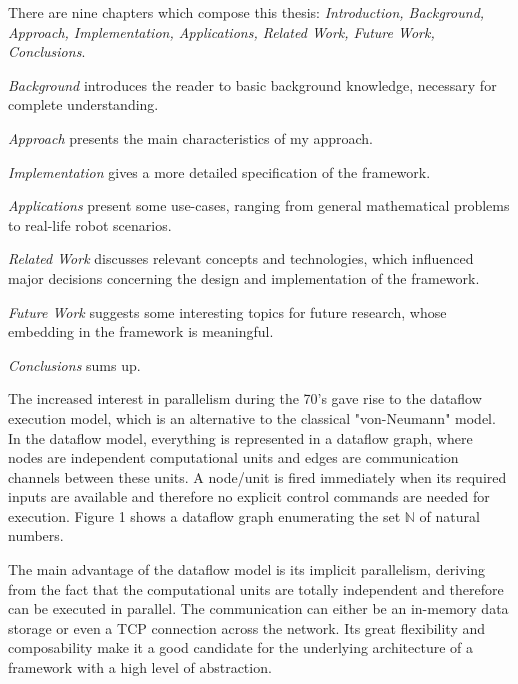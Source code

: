 \documentclass{dithesis}
\begin{document}

There are nine chapters which compose this thesis: \textit{Introduction, Background, Approach, Implementation, Applications, Related Work, Future Work, Conclusions}.

\textit{Background} introduces the reader to basic background knowledge, necessary for complete understanding.

\textit{Approach} presents the main characteristics of my approach.

\textit{Implementation} gives a more detailed specification of the framework.

\textit{Applications} present some use-cases, ranging from general mathematical problems to real-life robot scenarios.

\textit{Related Work} discusses relevant concepts and technologies, which influenced major decisions concerning the design and implementation of the framework.

\textit{Future Work} suggests some interesting topics for future research, whose embedding in the framework is meaningful.

\textit{Conclusions} sums up.


The increased interest in parallelism during the 70's gave rise to the dataflow execution model, which is an alternative to the classical "von-Neumann" model. In the dataflow model, everything is represented in a dataflow graph, where nodes are independent computational units  and edges are communication channels between these units. A node/unit is fired immediately when its required inputs are available and therefore no explicit control commands are needed for execution. Figure 1 shows a dataflow graph enumerating the set $\mathbb{N}$ of natural numbers.


The main advantage of the dataflow model is its implicit parallelism, deriving from the fact that the computational units are totally independent and therefore can be executed in parallel. The communication can either be an in-memory data storage or even a TCP connection across the network. Its great flexibility and composability make it a good candidate for the underlying architecture of a framework with a high level of abstraction.
\end{document}
